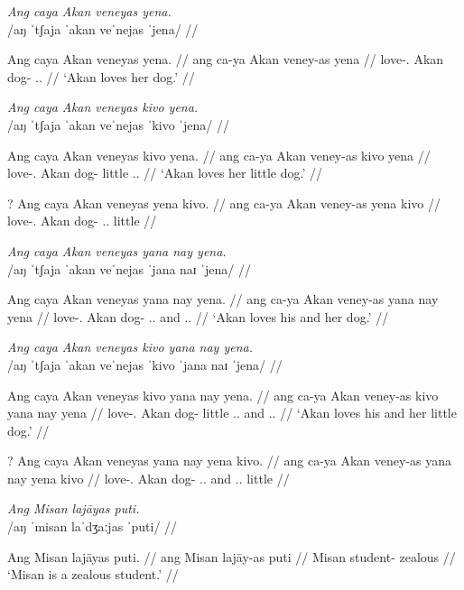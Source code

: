 \documentclass[12pt,a4paper]{scrartcl}
\newcommand{\TsgM}{{\Tsg}.{\M}}
\newcommand{\TsgF}{{\Tsg}.{\F}}
\begin{document}
\xe

\ex\begingl
\glpreamble \textit{Ang caya Akan veneyas yena.} \\
	/aŋ ˈtʃaja ˈakan veˈnejas ˈjena/ //

\gla Ang caya Akan veneyas yena. //
\glb ang ca-ya Akan veney-as yena //
\glc \AgtT{} love-\TsgM{} Akan dog-\Loc{} \TsgF{}.\Gen{} //
\glft `Akan loves her dog.' //
\endgl\xe

\pex
\a\begingl
\glpreamble \textit{Ang caya Akan veneyas kivo yena.} \\
	/aŋ ˈtʃaja ˈakan veˈnejas ˈkivo ˈjena/ //

\gla Ang caya Akan veneyas kivo yena. //
\glb ang ca-ya Akan veney-as kivo yena //
\glc \AgtT{} love-\TsgM{} Akan dog-\Loc{} little \TsgF{}.\Gen{} //
\glft `Akan loves her little dog.' //
\endgl

\a\ljudge?\begingl
\gla Ang caya Akan veneyas yena kivo. //
\glb ang ca-ya Akan veney-as yena kivo //
\glc \AgtT{} love-\TsgM{} Akan dog-\Loc{} \TsgF{}.\Gen{} little //
\endgl

\xe

\ex\begingl
\glpreamble \textit{Ang caya Akan veneyas yana nay yena.} \\
	/aŋ ˈtʃaja ˈakan veˈnejas ˈjana naɪ ˈjena/ //

\gla Ang caya Akan veneyas yana nay yena. //
\glb ang ca-ya Akan veney-as yana nay yena //
\glc \AgtT{} love-\TsgM{} Akan dog-\Loc{} \TsgM{}.\Gen{} and \TsgF{}.\Gen{} //
\glft `Akan loves his and her dog.' //
\endgl\xe

\pex
\a\begingl
\glpreamble \textit{Ang caya Akan veneyas kivo yana nay yena.} \\
	/aŋ ˈtʃaja ˈakan veˈnejas ˈkivo ˈjana naɪ ˈjena/ //

\gla Ang caya Akan veneyas kivo yana nay yena. //
\glb ang ca-ya Akan veney-as kivo yana nay yena //
\glc \AgtT{} love-\TsgM{} Akan dog-\Loc{} little \TsgM{}.\Gen{} and \TsgF{}.\Gen{} //
\glft `Akan loves his and her little dog.' //
\endgl

\a\ljudge?\begingl
\gla Ang caya Akan veneyas yana nay yena kivo. //
\glb ang ca-ya Akan veney-as yana nay yena kivo //
\glc \AgtT{} love-\TsgM{} Akan dog-\Loc{} \TsgM{}.\Gen{} and \TsgF{}.\Gen{} little //
\endgl

\xe

\pex
\a\begingl
\glpreamble \textit{Ang Misan lajāyas puti.} \\
	/aŋ ˈmisan laˈdʒaːjas ˈputi/ //

\gla Ang Misan lajāyas puti. //
\glb ang Misan lajāy-as puti //
\glc \Aarg{} Misan student-\Parg{} zealous //
\glft `Misan is a zealous student.' //
\endgl
\end{document}
